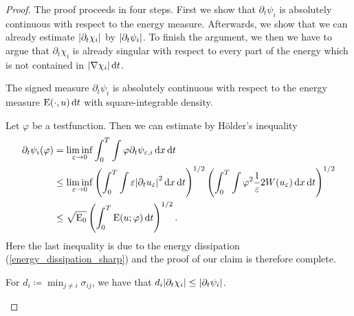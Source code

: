 \begin{proof}
	The proof proceeds in four steps. First we show that $ \partial_{ t } 
	\psi_{ i } $ is absolutely continuous with respect to the energy measure. 
	Afterwards, we show that we can already estimate $ \abs{ \partial_{ t } 
	\chi_{ i } } $ by $ \abs{ \partial_{ t } \psi_{ i } } $. To finish the 
	argument, we then we have to argue that $ \partial_{ t } \chi_{ i } $ is 
	already singular with respect to every part of the energy which is not 
	contained in $ \abs{ \nabla \chi_{ i } } \dd{ t } $.
	
	\begin{description}[wide=0pt]
		\item[Step 1:] The signed measure $ \partial_{  t } \psi_{ i } $ is 
		absolutely continuous with respect to the energy measure $ \operatorname{E} ( 
		\cdot, u ) \dd{t } $ with square-integrable density.
		
		Let $ \varphi $ be a testfunction. Then we can estimate by 
		Hölder's inequality
		\begin{align*}
			\partial_{ t } \psi_{ i } ( \varphi )
			& =
			\liminf_{ \varepsilon \to 0 }
			\int_{ 0 }^{ T }
			\int
			\varphi
			\partial_{ t } \psi_{ \varepsilon ,i }
			\dd{ x }
			\dd{ t }
			\\
			& \leq
			\liminf_{ \varepsilon \to 0 }
			\left(
			\int_{ 0 }^{ T }
			\int
			\varepsilon 
			\abs{ \partial_{ t } u_{ \varepsilon } }^{ 2 }
			\dd{ x }
			\dd{ t }
			\right)^{ 1/2 }
			\left(
			\int_{ 0 }^{ T }
			\int
			\varphi^{ 2 }
			\frac{ 1 }{ \varepsilon }
			2 W ( u_{ \varepsilon } )
			\dd{ x }
			\dd{ t }
			\right)^{ 1/2 }
			\\
			& \leq
			\sqrt{ \operatorname{E}_{ 0 } }
			\left(
			\int_{ 0 }^{ T }
			\operatorname{E} ( u ; \varphi )
			\dd{ t }
			\right)^{ 1/2 }.
		\end{align*}
		Here the last inequality is due to the energy dissipation 
		(\ref{energy_dissipation_sharp})
		and the proof of our claim is therefore complete.
		
		\item[Step 2:] For $ d_{ i } \coloneqq \min_{ j \neq i } \sigma_{ i j } 
		$, we have 
		that $ d_{ i } \abs{ \partial_{ t } \chi_{ i } } \leq \abs{ \partial_{ 
		t } \psi_{ i } } $.
		

\end{description}
\end{proof}
